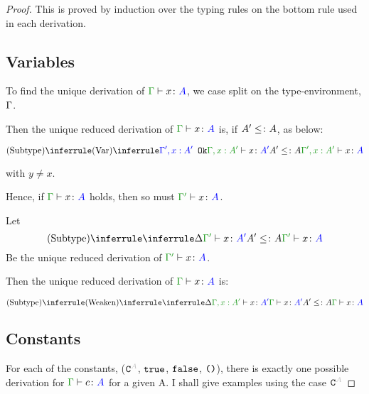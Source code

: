 \documentclass{report}
\begin{document}
\begin{framed}
    \begin{proof}
        This is proved by induction over the typing rules on the bottom rule used in each derivation.
        \subsection{Variables}
        To find the unique derivation of $\gtyperelation{x}{A}$, we case split on the type-environment, $\Gamma$.
        
        Then the unique reduced derivation of $\gtyperelation{x}{A}$ is, if $A' \leq\colon A$, as below:
        
        \begin{equation}
            \ntreeruleII{Subtype}{\ntreeruleI{Var}{\ok{\G', x: A'}}{\typerelation{\G,x: A'}{x}{A'}}}{ A' \subtype A}{\typerelation{\G', x: A'}{x}{A}}
        \end{equation}
        
         with $y \neq x$.
        
        Hence, if $\gtyperelation{x}{A}$ holds, then so must $\typerelation{\G'}{x}{A}$.
        
        Let 
        \begin{equation}
            \deltavrule{\G'}{x}{A'}{A}
        \end{equation}
        Be the  unique reduced derivation of $\typerelation{\G'}{x}{A}$.
        
        Then the unique reduced derivation of $\gtyperelation{x}{A}$ is:
        
        
        \begin{equation}
            \ntreeruleII{Subtype}{
                \ntreeruleI{Weaken}{
                    \treeruleI{\D}{\typerelation{\G, x: A'}{x}{A'}}
                }{\gtyperelation{x}{A'}}   
            }{ A' \subtype A
            }{\gtyperelation{x}{A}}
        \end{equation}
        
        \subsection{Constants}
        For each of the constants, ($\const{A}$, $\texttt{true}$, $\texttt{false}$, $\texttt{()}$), there is exactly one possible derivation for $\typerelation{\G}{c}{A}$ for a given A. I shall give examples using the case $\const{A}$
        

\end{proof}
\end{framed}
\end{document}
